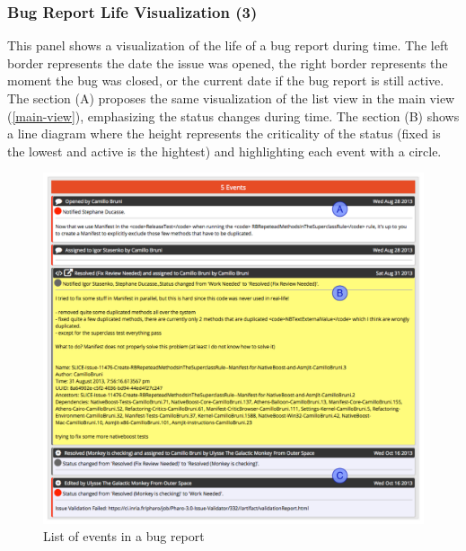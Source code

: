 \subsubsection{Bug Report Life Visualization (3)}
This panel shows a visualization of the life of a bug report during time.
The left border represents the date the issue was opened, the right border represents the moment the bug was closed, or the current date if the bug report is still active.
The section (A) proposes the same visualization of the list view in the main view (\ref{main-view}), emphasizing the status changes during time.
The section (B) shows a line diagram where the height represents the criticality of the status (\ie fixed is the lowest and active is the hightest) and highlighting each event with a circle.

\begin{figure}[t]
\begin{center}
\includegraphics[width=.85\linewidth]{Images/visualize/event-list.pdf}
\caption{List of events in a bug report}
\label{fig-event-list}
\end{center}
\end{figure}

